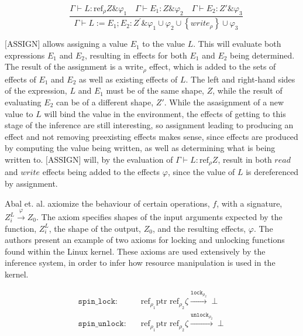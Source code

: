 \begin{equation*}
    [\text{ASSIGN}] \quad \frac{\Gamma \vdash L: \mathrm{ref}_{\rho} Z \& \varphi_{1} \quad \Gamma \vdash E_{1}: Z \& \varphi_{2} \quad \Gamma \vdash E_{2}: Z' \& \varphi_{3}}{\Gamma \vdash L:=E_{1} ; E_{2}: Z^{\prime} \& \varphi_{1} \cup \varphi_{2} \cup\left\{w r i t e_{\rho}\right\} \cup \varphi_{3}}
\end{equation*}

\newpar $\text{[ASSIGN]}$ allows assigning a value $E_1$ to the value $L$. This will evaluate both expressions $E_1$ and $E_2$, resulting in effects for both $E_1$ and $E_2$ being determined. The result of the assignment is a $\text{write}_\rho$ effect, which is added to the sets of effects of $E_1$ and $E_2$ as well as existing effects of $L$. The left and right-hand sides of the expression, $L$ and $E_1$ must be of the same shape, $Z$, while the result of evaluating $E_2$ can be of a different shape, $Z'$. While the asasignment of a new value to $L$ will bind the value in the environment, the effects of getting to this stage of the inference are still interesting, so assignment leading to producing an effect and not removing preexisting effects makes sense, since effects are produced by computing the value being written, as well as determining what is being written to. $\text{[ASSIGN]}$ will, by the evaluation of $\Gamma \vdash L: \text{ref}_{\rho} Z$, result in both $read$ and $write$ effects being added to the effects $\varphi$, since the value of $L$ is dereferenced by assignment. 

\newpar Abal et. al. axiomize the behaviour of certain operations, $f$, with a signature, $Z_{i}^{L} \stackrel{\varphi}{\rightarrow} Z_0$. The axiom specifies shapes of the input arguments expected by the function, $Z_{i}^{L}$, the shape of the output, $Z_0$, and the resulting effects, $\varphi$. The authors present an example of two axioms for locking and unlocking functions found within the Linux kernel. These axioms are used extensively by the inference system, in order to infer how resource manipulation is used in the kernel. 

\begin{equation*}
\begin{aligned}
        \texttt{spin\_lock}: \quad & \text{ref}_{\rho_1} \text{ptr } \text{ref}_{\rho_2} \zeta \xrightarrow{{\texttt{lock}}_{\rho_2}}\perp \\
        \texttt{spin\_unlock}: \quad & \text{ref}_{\rho_1} \text{ptr } \text{ref}_{\rho_2} \zeta \xrightarrow{{\texttt{unlock}}_{\rho_2}}\perp
\end{aligned}
\end{equation*}

